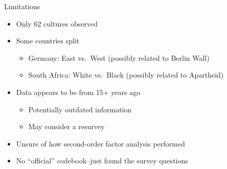 \documentclass[
  ignorenonframetext,
]{beamer}
\providecommand{\tightlist}{%
  \setlength{\itemsep}{0pt}\setlength{\parskip}{0pt}}
\begin{document}
\begin{frame}{Limitations}
\protect\hypertarget{limitations}{}
\begin{itemize}
\tightlist
\item
  Only 62 cultures observed
\item
  Some countries split

  \begin{itemize}
  \tightlist
  \item
    Germany: East vs.~West (possibly related to Berlin Wall)
  \item
    South Africa: White vs.~Black (possibly related to Apartheid)
  \end{itemize}
\item
  Data appears to be from 15+ years ago

  \begin{itemize}
  \tightlist
  \item
    Potentially outdated information
  \item
    May consider a resurvey
  \end{itemize}
\item
  Unsure of how second-order factor analysis performed
\item
  No ``official'' codebook--just found the survey questions
\end{itemize}
\end{frame}
\end{document}
